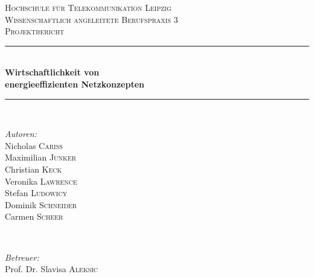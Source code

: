 
\begin{titlepage}

\newcommand{\HRule}{\rule{\linewidth}{0.5mm}} %

\center %
 

\textsc{\LARGE Hochschule für Telekommunikation Leipzig}\\[1.5cm] %
\textsc{\Large Wissenschaftlich angeleitete Berufspraxis 3}\\[0.5cm] %
\textsc{\large Projektbericht}\\[3cm] %


\HRule \\[0.5cm]
{ \huge \bfseries Wirtschaftlichkeit von }\\[0.4cm] %
{ \huge \bfseries energieeffizienten Netzkonzepten}\\[0.4cm] %
\HRule \\[5cm]
 

\begin{minipage}{0.4\textwidth}
\begin{flushleft} \large
\emph{Autoren:}\\
Nicholas \textsc{Cariss}\\ %
Maximilian \textsc{Junker} \\%
Christian \textsc{Keck} \\%
Veronika \textsc{Lawrence} \\%
Stefan \textsc{Ludowicy} \\%
Dominik \textsc{Schneider} \\%
Carmen \textsc{Scheer} \\%
\end{flushleft}
\end{minipage}
~
\begin{minipage}{0.4\textwidth}
\begin{flushright} \large
\emph{Betreuer:} \\
Prof. Dr. Slavisa \textsc{Aleksic} %
\end{flushright}
\end{minipage}\\[2cm]


\end{titlepage}
